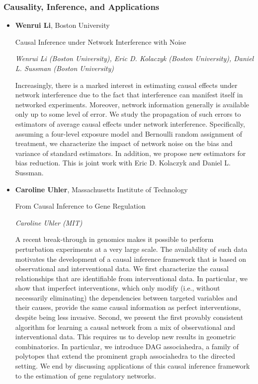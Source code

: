 \subsubsection*{Causality, Inference, and Applications}

\begin{itemize}
\item \textbf{Wenrui Li}, Boston University

Causal Inference under Network Interference with Noise

\emph{\footnotesize Wenrui Li (Boston University), Eric D. Kolaczyk (Boston University), Daniel L. Sussman (Boston University)}

Increasingly, there is a marked interest in estimating causal effects under network interference due to the fact that interference can manifest itself in networked experiments. Moreover, network information generally is available only up to some level of error. We study the propagation of such errors to estimators of average causal effects under network interference. Specifically, assuming a four-level exposure model and Bernoulli random assignment of treatment, we characterize the impact of network noise on the bias and variance of standard estimators. In addition, we propose new estimators for bias reduction. This is joint work with Eric D. Kolaczyk and Daniel L. Sussman.


\item \textbf{Caroline Uhler}, Massachusetts Institute of Technology

From Causal Inference to Gene Regulation

\emph{\footnotesize Caroline Uhler (MIT)}

A recent break-through in genomics makes it possible to perform perturbation experiments at a very large scale. The availability of such data motivates the development of a causal inference framework that is based on observational and interventional data. We first characterize the causal relationships that are identifiable from interventional data. In particular, we show that imperfect interventions, which only modify (i.e., without necessarily eliminating) the dependencies between targeted variables and their causes, provide the same causal information as perfect interventions, despite being less invasive. Second, we present the first provably consistent algorithm for learning a causal network from a mix of observational and interventional data. This requires us to develop new results in geometric combinatorics. In particular, we introduce DAG associahedra, a family of polytopes that extend the prominent graph associahedra to the directed setting. We end by discussing applications of this causal inference framework to the estimation of gene regulatory networks. 



\end{itemize}
